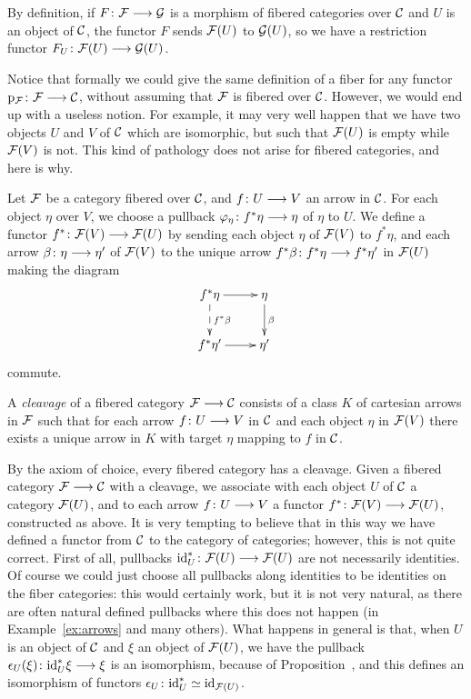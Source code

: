 \begin{3   FIBERED CATEGORIES}
\begin{3.1 Fibered categories}
By definition, if $F \colon \cF \arr \cG$ is a morphism of fibered categories over $\mathcal{C}$ and $U$ is an object of $\mathcal{C}$, the functor $F$ sends $\mathcal{F}(U)$ to $\mathcal{G}(U)$, so we have a restriction functor $F_U \colon \cF(U) \arr \cG(U)$.

Notice that formally we could give the same definition of a fiber for any functor $\p_{\cF} \colon \cF \arr \cC$, without assuming that $\mathcal{F}$ is fibered over $\mathcal{C}$. However, we would end up with a useless notion. For example, it may very well happen that we have two objects $U$ and $V$ of $\mathcal{C}$ which are isomorphic, but such that $\mathcal{F}(U)$ is empty while $\mathcal{F}(V)$ is not. This kind of pathology does not arise for fibered categories, and here is why.

Let $\mathcal{F}$ be a category fibered over $\mathcal{C}$, and $f \colon U \arr V$ an arrow in $\mathcal{C}$. For each object $\eta$ over $V$, we choose a pullback $\phi_\eta \colon f^*\eta \arr \eta$ of $\eta$ to $U$. We define a functor $f^* \colon \cF(V) \arr \cF(U)$ by sending each object $\eta$ of $\mathcal{F}(V)$ to $f^*\eta $, and each arrow $\beta\colon \eta \arr \eta'$ of $\mathcal{F}(V)$ to the unique arrow $f^*\beta \colon f^*\eta \arr f^*\eta'$ in $\mathcal{F}(U)$ making the diagram
   \[
   \xymatrix{
   f^* \eta\ar[r]\ar@{-->}[d]^{f^* \beta}
   &{}\eta\ar[d]^\beta\\
   f^* \eta'\ar[r]&{}\eta'\\}
   \] commute.

\begin{definition}
A \emph{cleavage} of a fibered category $\cF \arr \cC$ consists of a class $K$ of cartesian arrows in $\mathcal{F}$ such that for each arrow $f \colon U \arr V$ in $\mathcal{C}$ and each object $\eta$ in $\mathcal{F}(V)$ there exists a unique arrow in $K$ with target $\eta$ mapping to $f$ in $\mathcal{C}$.
\end{definition}

By the axiom of choice, every fibered category has a cleavage. Given a fibered category $\cF \arr \cC$ with a cleavage, we associate with each object $U$ of $\mathcal{C}$ a category $\mathcal{F}(U)$, and to each arrow $f \colon U \arr V$ a functor $f^* \colon \cF(V) \arr \cF(U)$, constructed as above. It is very tempting to believe that in this way we have defined a functor from $\mathcal{C}$ to the category of categories; however, this is not quite correct. First of all, pullbacks $\id_U^* \colon \cF(U) \arr \cF(U)$ are not necessarily identities. Of course we could just choose all pullbacks along identities to be identities on the fiber categories: this would certainly work, but it is not very natural, as there are often natural defined pullbacks where this does not happen (in Example~\ref{ex:arrows} and many others). What happens in general is that, when $U$ is an object of $\mathcal{C}$ and $\xi$ an object of $\mathcal{F}(U)$, we have the pullback $\isoiden_U(\xi)\colon\id_U^* \xi \arr \xi$ is an isomorphism, because of Proposition~, and this defines an isomorphism  of functors $\epsilon_U\colon \mathrm{id}_U^* \simeq \mathrm{id}_{\mathcal{F}(U)}$.


\end{3.1 Fibered categories}
\end{3   FIBERED CATEGORIES}
